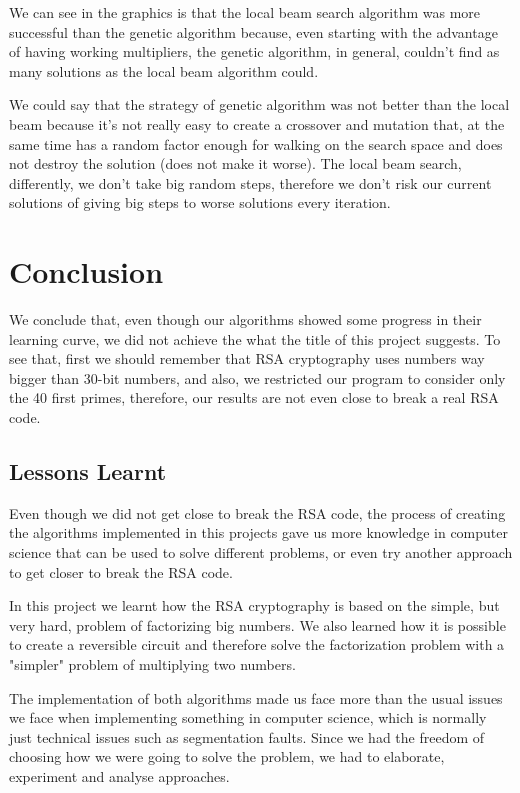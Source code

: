\documentclass[12pt]{article}
\begin{document}
We can see in the graphics is that the local beam search algorithm was more successful than the genetic algorithm because, even starting with the advantage of having working multipliers, the genetic algorithm, in general, couldn't find as many solutions as the local beam algorithm could. 

We could say that the strategy of genetic algorithm was not better than the local beam because it's not really easy to create a crossover and mutation that, at the same time has a random factor enough for walking on the search space and does not destroy the solution (does not make it worse). The local beam search, differently, we don't take big random steps, therefore we don't risk our current solutions of giving big steps to worse solutions every iteration.


\section{Conclusion}
We conclude that, even though our algorithms showed some progress in their learning curve, we did not achieve the what the title of this project suggests. To see that, first we should remember that RSA cryptography uses numbers way bigger than 30-bit numbers, and also, we restricted our program to consider only the 40 first primes, therefore, our results are not even close to break a real RSA code.

\subsection{Lessons Learnt}
Even though we did not get close to break the RSA code, the process of creating the algorithms implemented in this projects gave us more knowledge in computer science that can be used to solve different problems, or even try another approach to get closer to break the RSA code.

In this project we learnt how the RSA cryptography is based on the simple, but very hard, problem of factorizing big numbers. We also learned how it is possible to create a reversible circuit and therefore solve the factorization problem with a "simpler" problem of multiplying two numbers.

The implementation of both algorithms made us face more than the usual issues we face when implementing something in computer science, which is normally just technical issues such as segmentation faults. Since we had the freedom of choosing how we were going to solve the problem, we had to elaborate, experiment and analyse approaches. 
\end{document}
